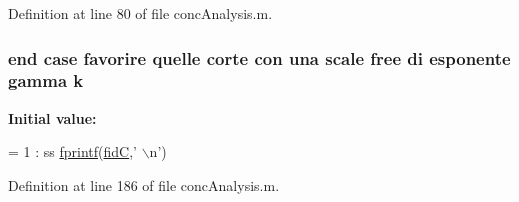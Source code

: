 Definition at line 80 of file conc\-Analysis.\-m.

\hypertarget{a00025_ab7005e24e9bb6ea9b6e14c4ac2614a31}{
\subsubsection[{k}]{ {\bf end} case favorire quelle corte con una scale free di esponente gamma k}}\label{a00025_ab7005e24e9bb6ea9b6e14c4ac2614a31}
{\bfseries Initial value\-:}
\begin{DoxyCode}
= 1 : ss    
            \hyperlink{a00027_a21172d88d238291f06b91067ea53f814}{fprintf}(\hyperlink{a00025_a5650dbe23ad9065391c1ea56f8acd34c}{fidC},\textcolor{stringliteral}{' \(\backslash\)n'})
\end{DoxyCode}


Definition at line 186 of file conc\-Analysis.\-m.

